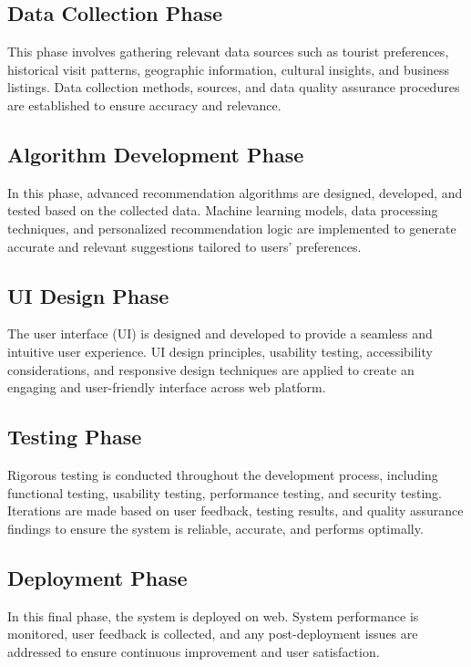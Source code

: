 \subsection{Data Collection Phase }
This phase involves gathering relevant data sources such as tourist preferences, historical visit patterns, geographic information, cultural insights, and business listings. Data collection methods, sources, and data quality assurance procedures are established to ensure accuracy and relevance.

\subsection{Algorithm Development Phase}
In this phase, advanced recommendation algorithms are designed, developed, and tested based on the collected data. Machine learning models, data processing techniques, and personalized recommendation logic are implemented to generate accurate and relevant suggestions tailored to users' preferences.

\subsection{UI Design Phase} 
The user interface (UI) is designed and developed to provide a seamless and intuitive user experience. UI design principles, usability testing, accessibility considerations, and responsive design techniques are applied to create an engaging and user-friendly interface across web platform.

\subsection{Testing Phase} 
Rigorous testing is conducted throughout the development process, including functional testing, usability testing, performance testing, and security testing. Iterations are made based on user feedback, testing results, and quality assurance findings to ensure the system is reliable, accurate, and performs optimally.

\subsection{Deployment Phase}
In this final phase, the system is deployed on web. System performance is monitored, user feedback is collected, and any post-deployment issues are addressed to ensure continuous improvement and user satisfaction.

